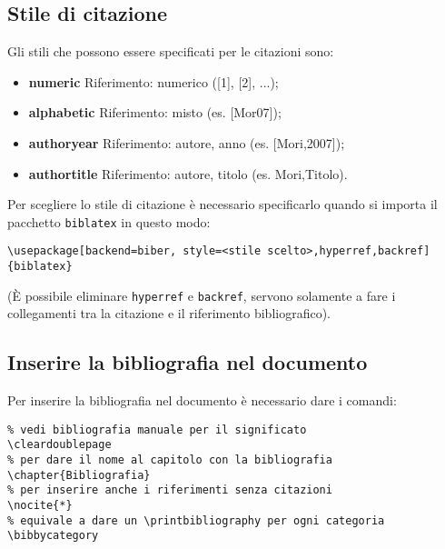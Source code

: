 \subsection{Stile di citazione}
Gli stili che possono essere specificati per le citazioni sono:
\begin{itemize}
    \item \textbf{numeric} Riferimento: numerico ([1], [2], ...);
    \item \textbf{alphabetic} Riferimento: misto (es. [Mor07]);
    \item \textbf{authoryear} Riferimento: autore, anno (es. [Mori,2007]);
    \item \textbf{authortitle} Riferimento: autore, titolo (es. Mori,Titolo).
\end{itemize}
Per scegliere lo stile di citazione è necessario specificarlo quando si importa
il pacchetto \verb!biblatex! in questo modo:
\begin{lstlisting}
\usepackage[backend=biber, style=<stile scelto>,hyperref,backref]{biblatex}
\end{lstlisting}
(È possibile eliminare \texttt{hyperref} e \texttt{backref}, servono solamente
a fare i collegamenti tra la citazione e il riferimento bibliografico).

\subsection{Inserire la bibliografia nel documento}
Per inserire la bibliografia nel documento è necessario dare i comandi:
\begin{lstlisting}
% vedi bibliografia manuale per il significato
\cleardoublepage
% per dare il nome al capitolo con la bibliografia
\chapter{Bibliografia}
% per inserire anche i riferimenti senza citazioni
\nocite{*}
% equivale a dare un \printbibliography per ogni categoria
\bibbycategory
\end{lstlisting}
